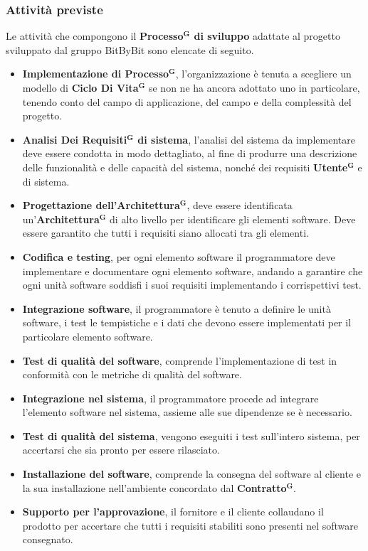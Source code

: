 \documentclass[a4paper,12pt]{article}
\newcommand{\term}[1]{\textbf{#1}$^\mathbf{G}$}
\begin{document}
\subsubsection{Attività previste}
Le attività che compongono il \textbf{\term{Processo} di sviluppo} adattate al progetto sviluppato dal gruppo BitByBit sono elencate di seguito.
\begin{itemize}
    \item \textbf{Implementazione di \term{Processo}}, l'organizzazione è tenuta a scegliere un modello di \term{Ciclo Di Vita} se non ne ha ancora adottato uno in particolare, tenendo conto del campo di applicazione, del campo e della complessità del progetto.
    \item \textbf{\term{Analisi Dei Requisiti} di sistema}, l'analisi del sistema da implementare deve essere condotta in modo dettagliato, al fine di produrre una descrizione delle funzionalità e delle capacità del sistema, nonché dei requisiti \term{Utente} e di sistema.
    \item \textbf{Progettazione dell'\term{Architettura}}, deve essere identificata un'\term{Architettura} di alto livello per identificare gli elementi software. Deve essere garantito che tutti i requisiti siano allocati tra gli elementi.
    \item \textbf{Codifica e testing}, per ogni elemento software il programmatore deve implementare e documentare ogni elemento software, andando a garantire che ogni unità software soddisfi i suoi requisiti implementando i corrispettivi test.
    \item \textbf{Integrazione software}, il programmatore è tenuto a definire le unità software, i test le tempistiche e i dati che devono essere implementati per il particolare elemento software.
    \item \textbf{Test di qualità del software}, comprende l'implementazione di test in conformità con le metriche di qualità del software.
    \item \textbf{Integrazione nel sistema}, il programmatore procede ad integrare l'elemento software nel sistema, assieme alle sue dipendenze se è necessario.
    \item \textbf{Test di qualità del sistema}, vengono eseguiti i test sull'intero sistema, per accertarsi che sia pronto per essere rilasciato.
    \item \textbf{Installazione del software}, comprende la consegna del software al cliente e la sua installazione nell'ambiente concordato dal \term{Contratto}.
    \item \textbf{Supporto per l'approvazione},  il fornitore e il cliente collaudano il prodotto per accertare che tutti i requisiti stabiliti sono presenti nel software consegnato.
\end{itemize}
\end{document}
